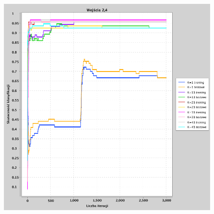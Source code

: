 \documentclass[a4paper, portrait,11pt]{article}
\begin{document}
\begin{figure}[!htb]
\begin{minipage}{0.33\textwidth}
    \caption{\label{fig:41_2_2,3derivative}}
  \end{minipage}
  \begin{minipage}{0.33\textwidth}
    \centering
    \includegraphics[width=1\linewidth]{../data/classification4/1/derivatives/2_2,4.png}
    \caption{\label{fig:41_2_2,4derivative}}
  \end{minipage}\hfill
\end{figure}
\end{document}
